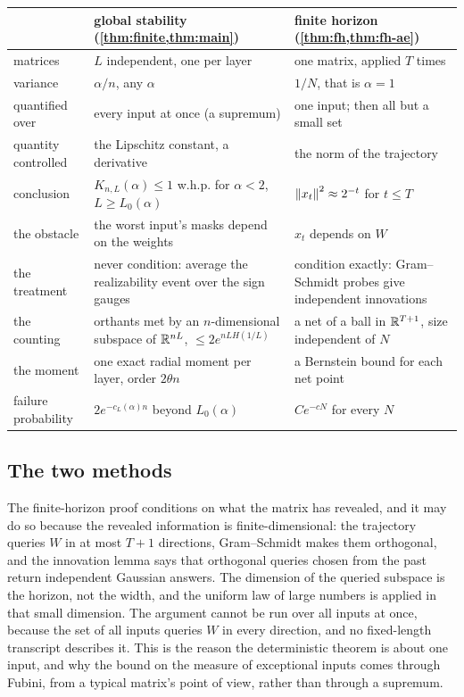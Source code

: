 \begin{center}
\begin{tabular}{p{}p{}p{}}
\toprule
 & global stability (\cref{thm:finite,thm:main}) & finite horizon (\cref{thm:fh,thm:fh-ae})\\
\midrule
matrices & $L$ independent, one per layer & one matrix, applied $T$ times\\
variance & $\alpha/n$, any $\alpha$ & $1/N$, that is $\alpha=1$\\
quantified over & every input at once (a supremum) & one input; then all but a small set\\
quantity controlled & the Lipschitz constant, a derivative & the norm of the trajectory\\
conclusion & $K_{n,L}(\alpha)\le1$ w.h.p. for $\alpha<2$, $L\ge L_0(\alpha)$ & $\left\lVert x_t\right\rVert^2\approx2^{-t}$ for $t\le T$\\
the obstacle & the worst input's masks depend on the weights & $x_t$ depends on $W$\\
the treatment & never condition: average the realizability event over the sign gauges & condition exactly: Gram--Schmidt probes give independent innovations\\
the counting & orthants met by an $n$-dimensional subspace of $\mathbb{R}^{nL}$, $\le 2e^{nLH(1/L)}$ & a net of a ball in $\mathbb{R}^{T+1}$, size independent of $N$\\
the moment & one exact radial moment per layer, order $2\theta n$ & a Bernstein bound for each net point\\
failure probability & $2e^{-c_L(\alpha)n}$ beyond $L_0(\alpha)$ & $Ce^{-cN}$ for every $N$\\
\bottomrule
\end{tabular}
\end{center}

\subsection{The two methods}

The finite-horizon proof conditions on what the matrix has revealed, and it may do so because the revealed information is finite-dimensional: the trajectory queries $W$ in at most $T+1$ directions, Gram--Schmidt makes them orthogonal, and the innovation lemma says that orthogonal queries chosen from the past return independent Gaussian answers. The dimension of the queried subspace is the horizon, not the width, and the uniform law of large numbers is applied in that small dimension. The argument cannot be run over all inputs at once, because the set of all inputs queries $W$ in every direction, and no fixed-length transcript describes it. This is the reason the deterministic theorem is about one input, and why the bound on the measure of exceptional inputs comes through Fubini, from a typical matrix's point of view, rather than through a supremum.

